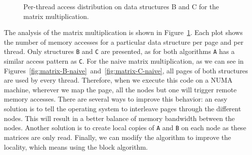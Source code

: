\begin{figure}[!t]
    \centering
    \caption{Per-thread access distribution on data structures B and C for the
    matrix multiplication.}
    \label{fig:matrix-analysis}
\end{figure}
The analysis of the matrix multiplication is shown in Figure~\ref{fig:matrix-analysis}.
Each plot shows the number of memory accesses for a particular data structure
per page and per thread. Only structures \texttt{B} and \texttt{C} are
presented, as for both algorithms \texttt{A} has a similar access
pattern as \texttt{C}.
For the naive matrix multiplication, as we can see in
Figures~\ref{fig:matrix-B-naive}~and~\ref{fig:matrix-C-naive}, all pages of both structures are used by every
thread. Therefore, when we execute this code on a NUMA machine, wherever we
map the page, all the nodes but one will trigger remote memory accesses. There
are several ways to improve this behavior: an easy solution
is to tell the operating system to interleave pages through the different
nodes. This will result in a better balance of memory bandwidth between the
nodes. Another solution is to create local copies of \texttt{A} and
\texttt{B} on each node as these matrices are only read. Finally, we can modify
the algorithm to improve the locality, which means using the block algorithm.


